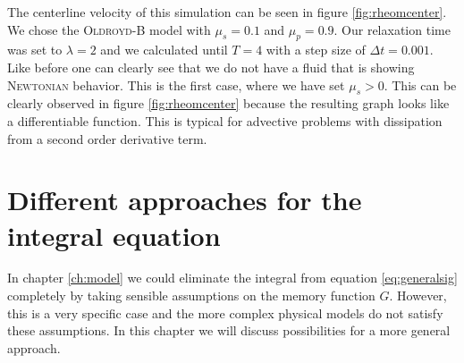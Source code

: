 \documentclass[12pt,a4paper,twoside, open=right]{scrreprt}
\theoremstyle{definition}
\theoremstyle{plain}
\begin{document}
\par The centerline velocity of this simulation can be seen in figure \ref{fig:rheomcenter}. We chose the \textsc{Oldroyd}-B model with $\mu_s=0.1$ and $\mu_p=0.9$. Our relaxation time was set to $\lambda=2$ and we calculated until $T=4$ with a step size of $\Delta t=0.001$. Like before one can clearly see that we do not have a fluid that is showing \textsc{Newtonian} behavior. This is the first case, where we have set $\mu_s>0$. This can be clearly observed in figure \ref{fig:rheomcenter} because the resulting graph looks like a differentiable function. This is typical for advective problems with dissipation from a second order derivative term.
\chapter{Different approaches for the integral equation}
In chapter \ref{ch:model} we could eliminate the integral from equation \eqref{eq:generalsig} completely by taking sensible assumptions on the memory function $G$. However, this is a very specific case and the more complex physical models do not satisfy these assumptions. In this chapter we will discuss possibilities for a more general approach. 
\end{document}
